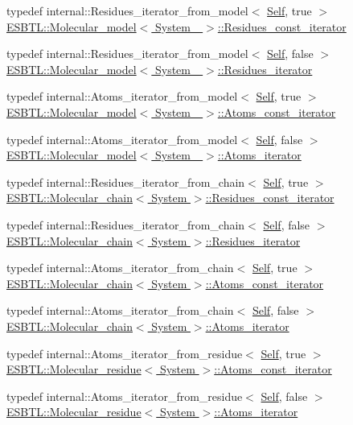 \begin{DoxyCompactItemize}
\item 
typedef internal\+::\+Residues\+\_\+iterator\+\_\+from\+\_\+model$<$ \hyperlink{classESBTL_1_1Molecular__model}{Self}, true $>$ \hyperlink{group__grp__iters_gab9417777a325c8ca02089328a4468703}{E\+S\+B\+T\+L\+::\+Molecular\+\_\+model$<$ System\+\_\+ $>$\+::\+Residues\+\_\+const\+\_\+iterator}
\item 
typedef internal\+::\+Residues\+\_\+iterator\+\_\+from\+\_\+model$<$ \hyperlink{classESBTL_1_1Molecular__model}{Self}, false $>$ \hyperlink{group__grp__iters_gae3b7c7057b27581b14109723b28a3abd}{E\+S\+B\+T\+L\+::\+Molecular\+\_\+model$<$ System\+\_\+ $>$\+::\+Residues\+\_\+iterator}
\item 
typedef internal\+::\+Atoms\+\_\+iterator\+\_\+from\+\_\+model$<$ \hyperlink{classESBTL_1_1Molecular__model}{Self}, true $>$ \hyperlink{group__grp__iters_ga41096063f109fca33976a17af4b3a1e4}{E\+S\+B\+T\+L\+::\+Molecular\+\_\+model$<$ System\+\_\+ $>$\+::\+Atoms\+\_\+const\+\_\+iterator}
\item 
typedef internal\+::\+Atoms\+\_\+iterator\+\_\+from\+\_\+model$<$ \hyperlink{classESBTL_1_1Molecular__model}{Self}, false $>$ \hyperlink{group__grp__iters_ga458a89ea78f235b807ca0d2dfd9a0427}{E\+S\+B\+T\+L\+::\+Molecular\+\_\+model$<$ System\+\_\+ $>$\+::\+Atoms\+\_\+iterator}
\item 
typedef internal\+::\+Residues\+\_\+iterator\+\_\+from\+\_\+chain$<$ \hyperlink{classESBTL_1_1Molecular__chain}{Self}, true $>$ \hyperlink{group__grp__iters_ga4cadd9ac293bcd967a86f97bfc626a7f}{E\+S\+B\+T\+L\+::\+Molecular\+\_\+chain$<$ System $>$\+::\+Residues\+\_\+const\+\_\+iterator}
\item 
typedef internal\+::\+Residues\+\_\+iterator\+\_\+from\+\_\+chain$<$ \hyperlink{classESBTL_1_1Molecular__chain}{Self}, false $>$ \hyperlink{group__grp__iters_gaccad04117ad7c730e41bdb9aeab8f116}{E\+S\+B\+T\+L\+::\+Molecular\+\_\+chain$<$ System $>$\+::\+Residues\+\_\+iterator}
\item 
typedef internal\+::\+Atoms\+\_\+iterator\+\_\+from\+\_\+chain$<$ \hyperlink{classESBTL_1_1Molecular__chain}{Self}, true $>$ \hyperlink{group__grp__iters_gad872d386b268126c9bb2a2127a6a7254}{E\+S\+B\+T\+L\+::\+Molecular\+\_\+chain$<$ System $>$\+::\+Atoms\+\_\+const\+\_\+iterator}
\item 
typedef internal\+::\+Atoms\+\_\+iterator\+\_\+from\+\_\+chain$<$ \hyperlink{classESBTL_1_1Molecular__chain}{Self}, false $>$ \hyperlink{group__grp__iters_gab2ee52ce4f9b656648669214cc44a4ea}{E\+S\+B\+T\+L\+::\+Molecular\+\_\+chain$<$ System $>$\+::\+Atoms\+\_\+iterator}
\item 
typedef internal\+::\+Atoms\+\_\+iterator\+\_\+from\+\_\+residue$<$ \hyperlink{classESBTL_1_1Molecular__residue}{Self}, true $>$ \hyperlink{group__grp__iters_gab312d7a420670665b99a379b51825c9c}{E\+S\+B\+T\+L\+::\+Molecular\+\_\+residue$<$ System $>$\+::\+Atoms\+\_\+const\+\_\+iterator}
\item 
typedef internal\+::\+Atoms\+\_\+iterator\+\_\+from\+\_\+residue$<$ \hyperlink{classESBTL_1_1Molecular__residue}{Self}, false $>$ \hyperlink{group__grp__iters_ga4f220ea2d647f555b579a7ab2831baa7}{E\+S\+B\+T\+L\+::\+Molecular\+\_\+residue$<$ System $>$\+::\+Atoms\+\_\+iterator}
\end{DoxyCompactItemize}
